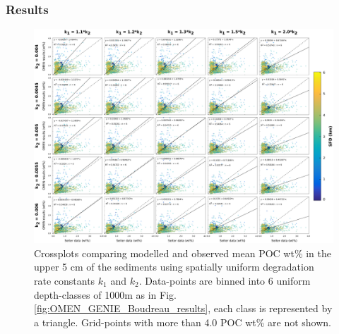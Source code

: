 \documentclass[gmd, manuscript]{copernicus}
\begin{document}
\subsubsection{Results}\label{subsubsec:couplingresultscrossplots}
\begin{figure}[tbp]
\begin{center}
	\includegraphics[width=1.0\textwidth]{figures/OMEN-GENIE-Exp/0_2908_Invariant_k_CROSSPLOT_WITH_REGRESSION_BigTriangles_120118.pdf}						    
	\caption{Crossplots comparing modelled and observed mean POC wt\% in the upper 5 cm of the sediments using spatially uniform degradation rate constants $k_1$ and $k_2$. 
	Data-points are binned into 6 uniform depth-classes of 1000m as in Fig. \ref{fig:OMEN_GENIE_Boudreau_results}, each class is represented by a triangle. 
	Grid-points with more than 4.0 POC wt\% are not shown.}\label{fig:OMEN_GENIE_invariant_results}
\end{center}
\end{figure}
\end{document}
